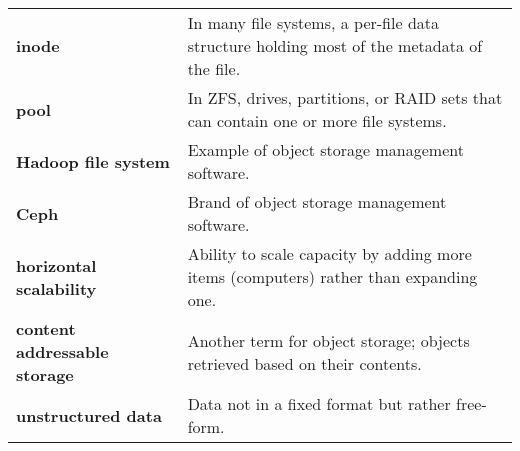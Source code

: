 \begin{tabular}{p{}p{}}
\textbf{inode} & In many file systems, a per-file data structure holding most of the metadata of the file. \\
\textbf{pool} & In ZFS, drives, partitions, or RAID sets that can contain one or more file systems. \\
\textbf{Hadoop file system} & Example of object storage management software. \\
\textbf{Ceph} & Brand of object storage management software. \\
\textbf{horizontal scalability} & Ability to scale capacity by adding more items (computers) rather than expanding one. \\
\textbf{content addressable storage} & Another term for object storage; objects retrieved based on their contents. \\
\textbf{unstructured data} & Data not in a fixed format but rather free-form. \\
\bottomrule
\end{tabular}

